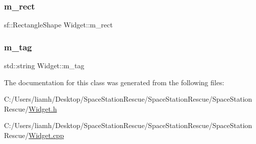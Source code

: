 \subsubsection{\texorpdfstring{m\_rect}{m\_rect}}
{\footnotesize\ttfamily sf\+::\+Rectangle\+Shape Widget\+::m\+\_\+rect\hspace{0.3cm}{\ttfamily [protected]}}

\mbox{\label{class_widget_ae0b0fc817eb62bdc9dd3aa5459020887}} 
\subsubsection{\texorpdfstring{m\_tag}{m\_tag}}
{\footnotesize\ttfamily std\+::string Widget\+::m\+\_\+tag\hspace{0.3cm}{\ttfamily [protected]}}



The documentation for this class was generated from the following files\+:\begin{DoxyCompactItemize}
\item 
C\+:/\+Users/liamh/\+Desktop/\+Space\+Station\+Rescue/\+Space\+Station\+Rescue/\+Space\+Station\+Rescue/\mbox{\hyperlink{_widget_8h}{Widget.\+h}}\item 
C\+:/\+Users/liamh/\+Desktop/\+Space\+Station\+Rescue/\+Space\+Station\+Rescue/\+Space\+Station\+Rescue/\mbox{\hyperlink{_widget_8cpp}{Widget.\+cpp}}\end{DoxyCompactItemize}

